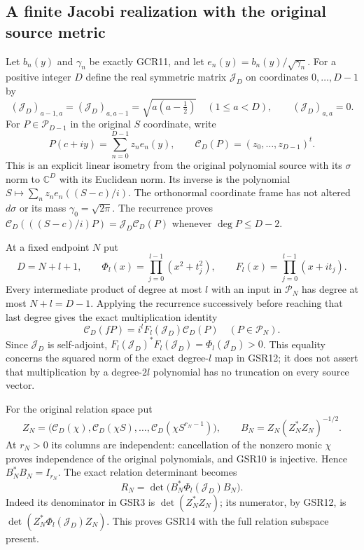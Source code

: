 \documentclass[11pt,a4paper]{article}
\begin{document}
\subsection{A finite Jacobi realization with the original source metric}

Let $b_n(y)$ and $\gamma_n$ be exactly GCR11, and let
$e_n(y)=b_n(y)/\sqrt{\gamma_n}$. For a positive integer $D$
define the real symmetric matrix $\mathcal J_D$ on coordinates
$0,\ldots,D-1$ by
\[
 (\mathcal J_D)_{a-1,a}=(\mathcal J_D)_{a,a-1}
       =\sqrt{a(a-\tfrac12)}\quad(1\leq a<D),
 \qquad(\mathcal J_D)_{a,a}=0.
\tag{GSR9}
\]
For $P\in\mathcal P_{D-1}$ in the original $S$ coordinate,
write
\[
 P(c+iy)=\sum_{n=0}^{D-1}z_n e_n(y),\qquad
 \mathcal C_D(P)=(z_0,\ldots,z_{D-1})^t .
\tag{GSR10}
\]
This is an explicit linear isometry from the original polynomial
source with its $\sigma$ norm to $\mathbb C^D$ with its Euclidean
norm. Its inverse is the polynomial
$S\mapsto\sum_nz_ne_n((S-c)/i)$. The orthonormal coordinate
frame has not altered $d\sigma$ or its mass $\gamma_0=\sqrt{2\pi}$.
The recurrence proves
$\mathcal C_D(((S-c)/i)P)=\mathcal J_D\mathcal C_D(P)$
whenever $\deg P\leq D-2$.

At a fixed endpoint $N$ put
\[
 D=N+l+1,\qquad
 \Phi_l(x)=\prod_{j=0}^{l-1}(x^2+t_j^2),\qquad
 F_l(x)=\prod_{j=0}^{l-1}(x+it_j).
\tag{GSR11}
\]
Every intermediate product of degree at most $l$ with an input
in $\mathcal P_N$ has degree at most $N+l=D-1$. Applying the
recurrence successively before reaching that last degree gives
the exact multiplication identity
\[
 \mathcal C_D(fP)=i^l F_l(\mathcal J_D)\mathcal C_D(P)
       \quad(P\in\mathcal P_N).
\tag{GSR12}
\]
Since $\mathcal J_D$ is self-adjoint,
$F_l(\mathcal J_D)^*F_l(\mathcal J_D)=\Phi_l(\mathcal J_D)>0$.
This equality concerns the squared norm of the exact degree-$l$
map in GSR12; it does not assert that multiplication by a
degree-$2l$ polynomial has no truncation on every source vector.

For the original relation space put
\[
 Z_N=
 \big(\mathcal C_D(\chi),\mathcal C_D(\chi S),\ldots,
                         \mathcal C_D(\chi S^{r_N-1})\big),\qquad
 B_N=Z_N(Z_N^*Z_N)^{-1/2}.
\tag{GSR13}
\]
At $r_N>0$ its columns are independent: cancellation of the
nonzero monic $\chi$ proves independence of the original
polynomials, and GSR10 is injective. Hence $B_N^*B_N=I_{r_N}$.
The exact relation determinant becomes
\[
 \boxed{\quad R_N=\det\bigl(B_N^*\Phi_l(\mathcal J_D)B_N\bigr).\quad}
\tag{GSR14}
\]
Indeed its denominator in GSR3 is $\det(Z_N^*Z_N)$; its
numerator, by GSR12, is
$\det(Z_N^*\Phi_l(\mathcal J_D)Z_N)$.
This proves GSR14 with the full relation subspace present.
\end{document}
